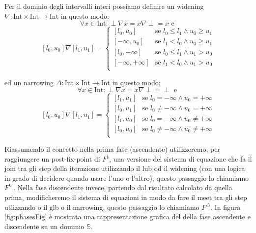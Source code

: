 \begin{example}
Per il dominio degli intervalli interi possiamo definire un widening \(\nabla:\textrm{Int}\times\textrm{Int}\rightarrow\textrm{Int}\) in questo modo: 
\[\forall x\in \textrm{Int}: \perp\nabla x = x\nabla\perp = x \textrm{ e } \]
\[
[l_0, u_0]\nabla[l_1, u_1] = 
\begin{cases}
    [l_0, u_0] & \textrm{se } l_0\leq l_1 \wedge u_0 \geq u_1 \\
    [-\infty, u_0] & \textrm{se } l_1 < l_0 \wedge u_0 \geq u_1 \\
    [l_0, +\infty] & \textrm{se } l_0\leq l_1 \wedge u_1 > u_0 \\
    [-\infty, +\infty] & \textrm{se } l_1 < l_0 \wedge u_1 > u_0 \\
\end{cases}
\]

ed un narrowing \(\Delta:\textrm{Int}\times\textrm{Int}\rightarrow\textrm{Int}\) in questo modo: 
\[\forall x\in \textrm{Int}: \perp\nabla x = x\nabla\perp = \perp \textrm{ e } \]
\[
[l_0, u_0]\nabla[l_1, u_1] = 
\begin{cases}
    [l_1, u_1] & \textrm{se } l_0 = -\infty \wedge u_0 = +\infty \\
    [l_0, u_1] & \textrm{se } l_0 \neq -\infty \wedge u_0 = +\infty \\
    [l_1, u_0] & \textrm{se } l_0 = -\infty \wedge u_0 \neq +\infty \\
    [l_0, u_0] & \textrm{se } l_0 \neq -\infty \wedge u_0 \neq +\infty \\
\end{cases}
\]
\end{example}

Riassumendo il concetto nella prima fase (ascendente) utilizzeremo, per raggiungere un post-fix-point di \(F^{\natural}\), una versione del sistema di equazione che fa il join tra gli step della iterazione utilizzando il lub od il widening (con una logica in grado di decidere quando usare l'uno o l'altro), questo passaggio lo chiamiamo \(F^{\nabla}\). Nella fase discendente invece, partendo dal risultato calcolato da quella prima, modificheremo il sistema di equazioni in modo da fare il meet tra gli step utlizzando o il glb o il narrowing, questo passaggio lo chiamiamo \(F^{\Delta}\). 
In figura \ref{fig:phasesFig} è mostrata una rappresentazione grafica del della fase ascendente e discendente su un dominio \(\mathbb{S}\).

